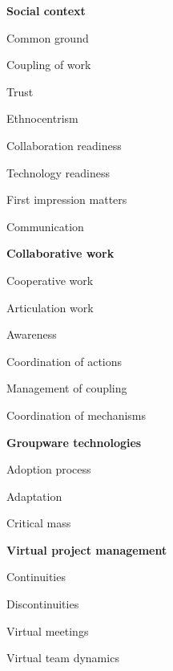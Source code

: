 \textbf{Social context}
\begin{list_type}
  \item Common ground
  \item Coupling of work
  \item Trust
	\item Ethnocentrism
	\item Collaboration readiness
	\item Technology readiness
	\item First impression matters
	\item Communication
\end{list_type}
\textbf{Collaborative work}
\begin{list_type}
  \item Cooperative work
  \item Articulation work
  \item Awareness
	\item Coordination of actions
	\item Management of coupling
	\item Coordination of mechanisms
\end{list_type}
\textbf{Groupware technologies}
\begin{list_type}
  \item Adoption process
  \item Adaptation
  \item Critical mass
\end{list_type}
\textbf{Virtual project management}
\begin{list_type}
  \item Continuities
  \item Discontinuities
  \item Virtual meetings
	\item Virtual team dynamics
\end{list_type}